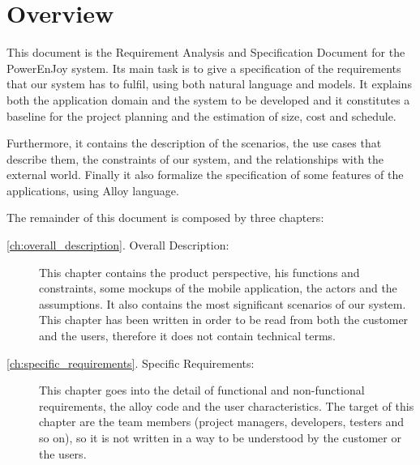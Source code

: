 \section{Overview}
This document is the Requirement Analysis and Specification Document for the PowerEnJoy system.
Its main task is to give a specification of the requirements that our system has to fulfil, using both natural language and models.
It explains both the application domain and the system to be developed and it constitutes a baseline for the project planning and the estimation of size, cost and schedule.

Furthermore, it contains the description of the scenarios, the use cases that describe them, the constraints of our system, and the relationships with the external world. Finally it also formalize the specification of some features of the applications, using Alloy language.

The remainder of this document is composed by three chapters:
\begin{description}
	\item [\autoref{ch:overall_description}. Overall Description:] This chapter contains the product perspective, his functions and constraints, some mockups of the mobile application, the actors and the assumptions. It also contains the most significant scenarios of our system.
	This chapter has been written in order to be read from both the customer and the users, therefore it does not contain technical terms.
	\item [\autoref{ch:specific_requirements}. Specific Requirements:] This chapter goes into the detail of functional and non-functional requirements, the alloy code and the user characteristics.
	The target of this chapter are the team members (project managers, developers, testers and so on), so it is not written in a way to be understood by the customer or the users.
\end{description}
